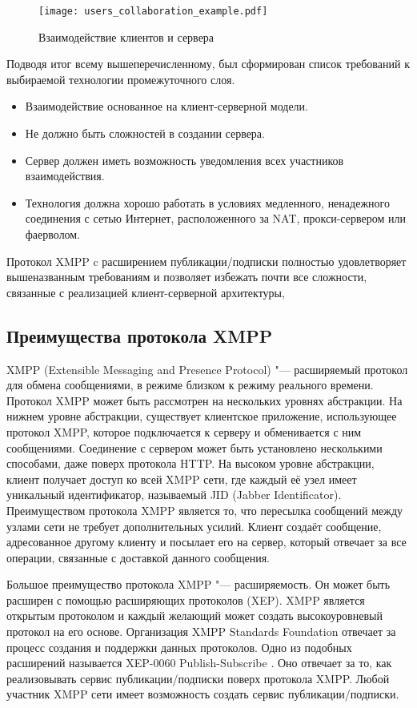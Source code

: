 \begin{figure}[!h]
  \centering
  \texttt{[image: users\_collaboration\_example.pdf]}
  \caption{Взаимодействие клиентов и сервера}
  \label{img:users_collaboration_example}
\end{figure} 

Подводя итог всему вышеперечисленному, был сформирован список требований к
выбираемой технологии промежуточного слоя.
\begin{itemize}
\item Взаимодействие основанное на клиент-серверной модели.
\item Не должно быть сложностей в создании сервера.
\item Сервер должен иметь возможность уведомления всех участников
взаимодействия.
\item Технология должна хорошо работать в условиях медленного, ненадежного
соединения с сетью Интернет, расположенного за NAT, прокси-сервером или
фаерволом.
\end{itemize}

Протокол XMPP c расширением публикации/подписки полностью удовлетворяет
вышеназванным требованиям и позволяет избежать почти все сложности, связанные с
реализацией клиент-серверной архитектуры, 

\subsection{Преимущества протокола XMPP}
XMPP (Extensible Messaging and Presence Protocol) "--- расширяемый протокол для
обмена сообщениями, в режиме близком к режиму реального времени. Протокол XMPP
может быть рассмотрен на нескольких уровнях абстракции. На нижнем уровне
абстракции, существует клиентское приложение, использующее протокол XMPP,
которое подключается к серверу и обменивается с ним сообщениями. Соединение с
сервером может быть установлено несколькими способами, даже поверх протокола
HTTP. На высоком уровне абстракции, клиент получает доступ ко всей XMPP сети,
где каждый её узел имеет уникальный идентификатор, называемый JID (Jabber
Identificator). Преимуществом протокола XMPP является то, что пересылка
сообщений между узлами сети не требует дополнительных усилий. Клиент создаёт
сообщение, адресованное другому клиенту и посылает его на сервер, который
отвечает за все операции, связанные с доставкой данного сообщения.

Большое преимущество протокола XMPP "--- расширяемость. Он может быть расширен с
помощью расширяющих протоколов (XEP). XMPP является открытым протоколом и каждый
желающий может создать высокоуровневый протокол на его основе. Организация XMPP
Standards Foundation отвечает за процесс создания и поддержки данных протоколов.
Одно из подобных расширений называется XEP-0060 Publish-Subscribe
\cite{xep-0060}. Оно отвечает за то, как реализовывать сервис
публикации/подписки поверх протокола XMPP. Любой участник XMPP сети имеет
возможность создать сервис публикации/подписки.

